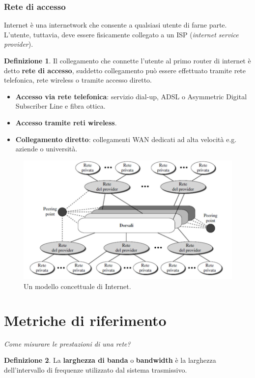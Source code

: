 \documentclass[11pt,a4paper,oneside]{book}
\theoremstyle{definition}
\newtheorem{definition}{Definizione}[section]
\begin{document}
\subsubsection{Rete di accesso}
Internet è una internetwork che consente a qualsiasi utente
di farne parte. L’utente, tuttavia, deve essere fisicamente collegato a un
ISP (\textit{internet service provider}).
\theoremstyle{definition}
\begin{definition}
	Il collegamento che connette l'utente al primo router di internet è detto \textbf{rete di accesso}, suddetto collegamento può essere effettuato tramite rete telefonica, rete wireless o tramite accesso diretto.
\end{definition}
\begin{itemize}
	\item \textbf{Accesso via rete telefonica}: servizio dial-up, ADSL o Asymmetric Digital Subscriber Line e fibra ottica.
	\item \textbf{Accesso tramite reti wireless}.
	\item \textbf{Collegamento diretto}: collegamenti WAN dedicati ad alta velocità e.g. aziende o
	      università.
\end{itemize}

\pagebreak

\begin{figure}[!h]
	\includegraphics[scale=0.55]{Immagini/Internet_Concept.png}
	\centering
	\caption{Un modello concettuale di Internet.}
\end{figure}

\section{Metriche di riferimento}
\textit{Come misurare le prestazioni di una rete?}\newline

\theoremstyle{definition}
\begin{definition}
	La \textbf{larghezza di banda} o \textbf{bandwidth} è la larghezza dell'intervallo di frequenze utilizzato dal sistema trasmissivo.
\end{definition}
\end{document}
